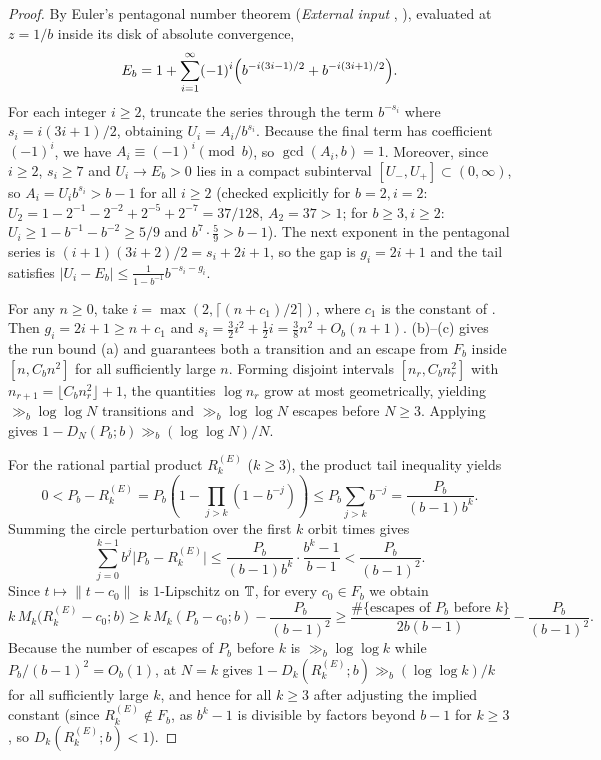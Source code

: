 \documentclass[11pt]{article}
\newcommand{\dist}[1]{\lVert #1\rVert}
\begin{document}
\begin{proof}
By Euler's pentagonal number theorem (\emph{External input} \cite[Chapter~1]{Andrews1976}, \cite{EulerE541}), evaluated at $z=1/b$ inside its disk of absolute convergence,
\[
E_b=1+\sum_{i=1}^\infty(-1)^i\Bigl(b^{-i(3i-1)/2}+b^{-i(3i+1)/2}\Bigr).
\]
For each integer $i\ge2$, truncate the series through the term $b^{-s_i}$ where $s_i=i(3i+1)/2$, obtaining $U_i=A_i/b^{s_i}$. Because the final term has coefficient $(-1)^i$, we have $A_i\equiv(-1)^i\pmod b$, so $\gcd(A_i,b)=1$. Moreover, since $i\ge2$, $s_i\ge7$ and $U_i\to E_b>0$ lies in a compact subinterval $[U_-,U_+]\subset(0,\infty)$, so $A_i=U_ib^{s_i}>b-1$ for all $i\ge2$ (checked explicitly for $b=2,i=2$: $U_2=1-2^{-1}-2^{-2}+2^{-5}+2^{-7}=37/128$, $A_2=37>1$; for $b\ge3,i\ge2$: $U_i\ge 1-b^{-1}-b^{-2}\ge 5/9$ and $b^7\cdot\frac59>b-1$). The next exponent in the pentagonal series is $(i+1)(3i+2)/2=s_i+2i+1$, so the gap is $g_i=2i+1$ and the tail satisfies $|U_i-E_b|\le\frac{1}{1-b^{-1}}b^{-s_i-g_i}$.

For any $n\ge0$, take $i=\max(2,\lceil(n+c_1)/2\rceil)$, where $c_1$ is the constant of . Then $g_i=2i+1\ge n+c_1$ and $s_i=\frac32i^2+\frac12i=\frac38n^2+O_b(n+1)$. (b)--(c) gives the run bound (a) and guarantees both a transition and an escape from $F_b$ inside $[n,C_b n^2]$ for all sufficiently large $n$. Forming disjoint intervals $[n_r,C_b n_r^2]$ with $n_{r+1}=\lfloor C_b n_r^2\rfloor+1$, the quantities $\log n_r$ grow at most geometrically, yielding $\gg_b\log\log N$ transitions and $\gg_b\log\log N$ escapes before $N\ge3$. Applying  gives $1-D_N(P_b;b)\gg_b(\log\log N)/N$.

For the rational partial product $R_k^{(E)}$ ($k\ge3$), the product tail inequality yields
\[
0<P_b-R_k^{(E)}=P_b\left(1-\prod_{j>k}(1-b^{-j})\right)\le P_b\sum_{j>k}b^{-j}=\frac{P_b}{(b-1)b^k}.
\]
Summing the circle perturbation over the first $k$ orbit times gives
\[
\sum_{j=0}^{k-1}b^j\bigl|P_b-R_k^{(E)}\bigr|
\le\frac{P_b}{(b-1)b^k}\cdot\frac{b^k-1}{b-1}
<\frac{P_b}{(b-1)^2}.
\]
Since $t\mapsto\dist{t-c_0}$ is $1$-Lipschitz on $\mathbb T$, for every $c_0\in F_b$ we obtain
\[
k\,M_k\bigl(R_k^{(E)}-c_0;b\bigr)
\ge k\,M_k(P_b-c_0;b)-\frac{P_b}{(b-1)^2}
\ge \frac{\#\{\text{escapes of }P_b\text{ before }k\}}{2b(b-1)}-\frac{P_b}{(b-1)^2}.
\]
Because the number of escapes of $P_b$ before $k$ is $\gg_b\log\log k$ while $P_b/(b-1)^2=O_b(1)$,  at $N=k$ gives $1-D_k(R_k^{(E)};b)\gg_b(\log\log k)/k$ for all sufficiently large $k$, and hence for all $k\ge3$ after adjusting the implied constant (since $R_k^{(E)}\notin F_b$, as $b^k-1$ is divisible by factors beyond $b-1$ for $k\ge3$, so $D_k(R_k^{(E)};b)<1$).
\end{proof}
\end{document}
